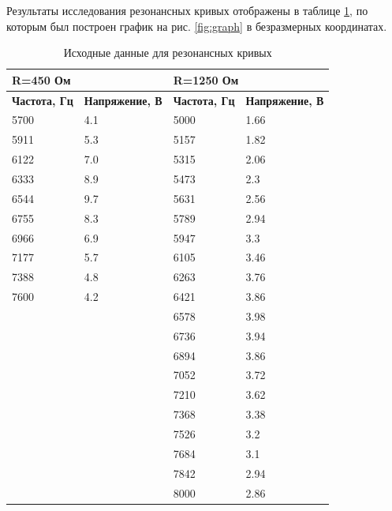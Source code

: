 \documentclass{lab}
\begin{document}
Результаты исследования резонансных кривых отображены в таблице \ref{tabb}, по которым был построен график на рис. \ref{fig:graph} в безразмерных координатах.
\begin{table}[]
    \centering
    \begin{tabular}{|l|l|l|l|}
        \hline
        \multicolumn{2}{|l|}{\textbf{R=450 Ом}}         & \multicolumn{2}{l|}{\textbf{R=1250 Ом}}        \\ \hline
        \textbf{Частота, Гц} & \textbf{Напряжение, В} & \textbf{Частота, Гц} & \textbf{Напряжение, В} \\ \hline
        5700 & 4.1 & 5000 & 1.66 \\\hline
        5911 & 5.3 & 5157 & 1.82 \\\hline
        6122 & 7.0 & 5315 & 2.06 \\\hline
        6333 & 8.9 & 5473 & 2.3 \\\hline
        6544 & 9.7 & 5631 & 2.56 \\\hline
        6755 & 8.3 & 5789 & 2.94 \\\hline
        6966 & 6.9 & 5947 & 3.3 \\\hline
        7177 & 5.7 & 6105 & 3.46 \\\hline
        7388 & 4.8 & 6263 & 3.76 \\\hline
        7600 & 4.2 & 6421 & 3.86 \\\hline
        &     & 6578 & 3.98 \\\hline
        &     & 6736 & 3.94 \\\hline
        &     & 6894 & 3.86 \\\hline
        &     & 7052 & 3.72 \\\hline
        &     & 7210 & 3.62 \\\hline
        &     & 7368 & 3.38 \\\hline
        &     & 7526 & 3.2 \\\hline
        &     & 7684 & 3.1 \\\hline
        &     & 7842 & 2.94 \\\hline
        &     & 8000 & 2.86 \\\hline
    \end{tabular}
    \caption{Исходные данные для резонансных кривых}
    \label{tabb}
\end{table}
\end{document}
